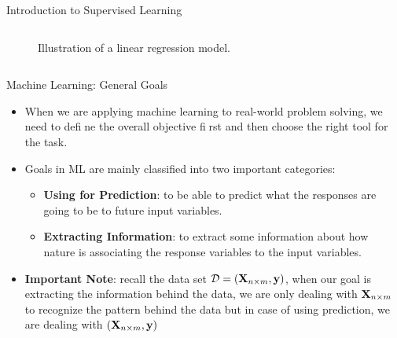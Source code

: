 \documentclass[compress,oilve]{beamer}
\begin{document}
\begin{frame}{Introduction to Supervised Learning}
\begin{columns}
\begin{column}{0.4\textwidth}
\begin{figure}
 \caption{Illustration of a linear regression model.}
\end{figure}
\end{column}
\end{columns}
\end{frame}

\begin{frame}{Machine Learning: General Goals}
\begin{itemize}
\item When we are applying machine learning to real-world
problem solving, we need to define the overall objective first and then choose the right tool
for the task.
\item Goals in ML are mainly classified into two important categories:
\begin{itemize}
\item \textbf{Using for Prediction}: to be able to predict what the responses are going to be to future input variables.
\item \textbf{Extracting Information}: to extract some information about how nature is associating the response variables to the input variables.
\end{itemize}
\item \textbf{Important Note}: recall the data set $ \mathcal{D} = (\mathbf{X_{\mathnormal n \times \mathnormal m}} , \mathbf{y}) $, when our goal is extracting the information behind the data, we are only dealing with $ \mathbf{X_{\mathnormal n \times \mathnormal m}} $ to recognize the pattern behind the data but in case of using prediction, we are dealing with $ (\mathbf{X_{\mathnormal n \times \mathnormal m}} , \mathbf{y}) $
\end{itemize}
\end{frame}
\end{document}
